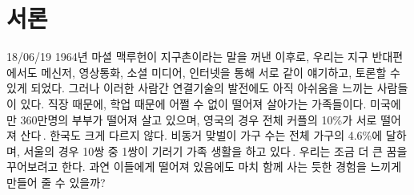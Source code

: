 \chapter{서론}

18/06/19
1964년 마셜 맥루헌이 지구촌이라는 말을 꺼낸 이후로\cite{mcluhan1994understanding}, 우리는 지구 반대편에서도 메신저, 영상통화, 소셜 미디어, 인터넷을 통해 서로 같이 얘기하고, 토론할 수 있게 되었다.
그러나 이러한 사람간 연결기술의 발전에도 아직 아쉬움을 느끼는 사람들이 있다. 직장 때문에, 학업 때문에 어쩔 수 없이 떨어져 살아가는 가족들이다. 미국에만 360만명의 부부가 떨어져 살고 있으며, 영국의 경우 전체 커플의 10\%가 서로 떨어져 산다\,\cite{strohm2009living, duncan2013people}. 
한국도 크게 다르지 않다. 비동거 맞벌이 가구 수는 전체 가구의 4.6\%에 달하며, 서울의 경우 10쌍 중 1쌍이 기러기 가족 생활을 하고 있다\,\cite{rock2016goose, wise2012seoul}.
우리는 조금 더 큰 꿈을 꾸어보려고 한다. 과연 이들에게 떨어져 있음에도 마치 함께 사는 듯한 경험을 느끼게 만들어 줄 수 있을까?

